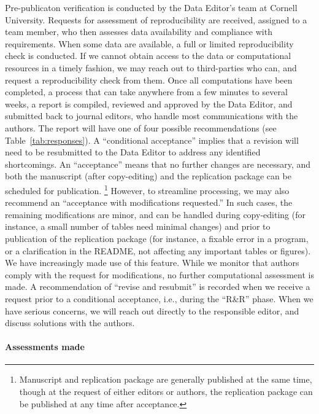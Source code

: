 \documentclass[PP]{AEA}
\begin{document}
Pre-publicaton verification is conducted by the Data Editor's team at Cornell University. 
Requests for assessment of reproducibility are received, assigned to a team member, who then assesses data availability and compliance with requirements. When some data are available, a full or limited reproducibility check is conducted. If we cannot obtain access to the data or computational resources in a timely fashion, we may reach out to third-parties who can, and request a reproducibility check from them. Once all computations have been completed, a process that can take anywhere from a few minutes to several weeks, a report is compiled, reviewed and approved by the Data Editor, and submitted back to journal editors, who handle most communications with the authors. The report will have  one of four possible recommendations (see Table~\ref{tab:responses}). A ``conditional acceptance'' implies that a revision will need to be resubmitted to the Data Editor to address any identified shortcomings. An ``acceptance'' means that no further changes are necessary, and both the manuscript (after copy-editing) and the replication package can be scheduled for publication.%
%
\footnote{Manuscript and replication package are generally published at the same time, though at the request of either editors or authors, the replication package can be published at any time after acceptance.} 
%
However, to streamline processing, we may also recommend an ``acceptance with modifications requested.'' In such cases, the remaining modifications are minor, and can be handled during copy-editing (for instance, a small number of tables need minimal changes) and prior to publication of the replication package (for instance, a fixable error in a program, or a clarification in the README, not affecting any important tables or figures). We have increasingly made use of this feature. While we monitor that authors comply with the request for modifications, no further computational assessment is made. A recommendation of  ``revise and resubmit'' is recorded when we receive a request prior to a conditional acceptance, i.e., during the ``R\&R'' phase. When we have serious concerns, we will reach out directly to the responsible editor, and discuss solutions with the authors. 





\paragraph{Assessments made}
\end{document}
